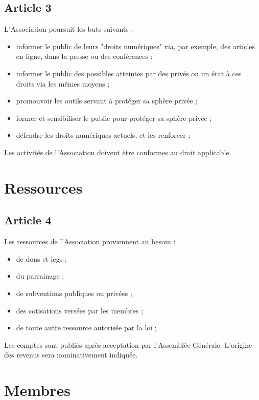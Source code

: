 \documentclass[12pt,twoside]{report}
\begin{document}
\section*{Article 3}
L’Association poursuit les buts suivants :
\begin{itemize}
\item informer le public de leurs "droits numériques" via, par exemple, des articles en ligne, dans la presse ou des conférences ;
\item informer le public des possibles atteintes par des privés ou un état à ces droits via les mêmes moyens ;
\item promouvoir les outils servant à protéger sa sphère privée ;
\item former et sensibiliser le public pour protéger sa sphère privée ;
\item défendre les droits numériques actuels, et les renforcer ;
\end{itemize}

Les activités de l’Association doivent être conformes au droit applicable.

\chapter*{Ressources}

\section*{Article 4}
Les ressources de l’Association proviennent au besoin :
\begin{itemize}
\item de dons et legs ;
\item du parrainage ;
\item de subventions publiques ou privées ;
\item des cotisations versées par les membres ;
\item de toute autre ressource autorisée par la loi ;
\end{itemize}

Les comptes sont publiés après acceptation par l’Assemblée Générale. L’origine des revenus sera nominativement indiquée.

\chapter*{Membres}
\end{document}
